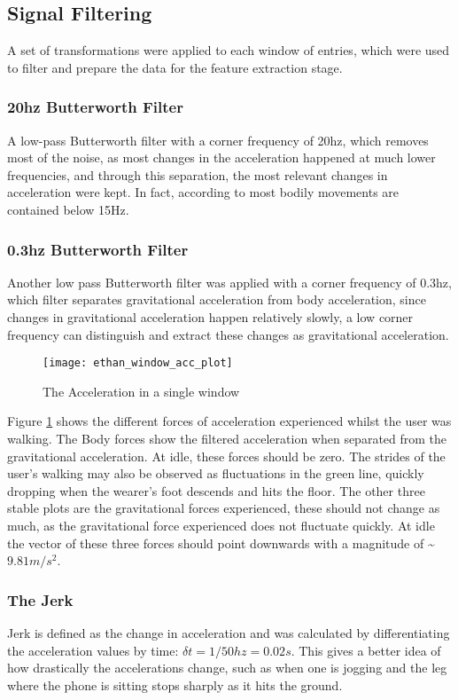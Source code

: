 \subsection{Signal Filtering}
A set of transformations were applied to each window of entries, which were used to filter and prepare the data for the feature extraction stage.

\subsubsection{20hz Butterworth Filter}
A low-pass Butterworth filter with a corner frequency of 20hz, which removes most of the noise, as most changes in the acceleration happened at much lower frequencies, and through this separation, the most relevant changes in acceleration were kept. In fact, according to \cite{Karantonis2006} most bodily movements are contained below 15Hz.

\subsubsection{0.3hz Butterworth Filter}
Another low pass Butterworth filter was applied with a corner frequency of 0.3hz, which filter separates gravitational acceleration from body acceleration, since changes in gravitational acceleration happen relatively slowly, a low corner frequency can distinguish and extract these changes as gravitational acceleration. 
\begin{figure}[htp]
    \centering
    \texttt{[image: ethan\_window\_acc\_plot]}
    \caption{The Acceleration in a single window}
    \label{fig:figure_single_wind}
    \end{figure}

Figure \ref{fig:figure_single_wind} shows the 
different forces of acceleration experienced whilst the user was walking.
The Body forces show the filtered acceleration when separated from the gravitational acceleration. At idle, these forces should be zero. 
The strides of the user's walking may also be observed as fluctuations in the green line, quickly dropping when the wearer’s foot descends and hits the floor. 
The other three stable plots are the gravitational forces experienced, these should not change as much, as the gravitational force experienced does not fluctuate quickly. At idle the vector of these three forces should point 
downwards with a magnitude of \textasciitilde $9.81m/s^2$.

\subsubsection{The Jerk}
Jerk is defined as the change in acceleration and was calculated by differentiating the acceleration values by time: $\delta t = 1/50hz = 0.02s$. This gives a better idea of how drastically the accelerations change, such as when one is jogging and the leg where the phone is sitting stops sharply as it hits the ground.


